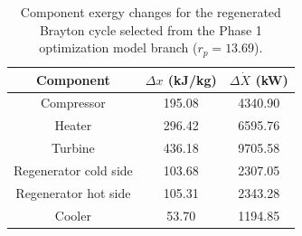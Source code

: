 \begin{table}[htbp]
    \centering
    \caption{Component exergy changes for the regenerated Brayton cycle selected from the Phase 1 optimization model branch ($r_p = 13.69$).}
    \label{tab:phase5_component_exergy_phase1_optimization}
    \begin{tabular}{c c c}
        \hline
        Component & $\Delta x$ (kJ/kg) & $\Delta \dot{X}$ (kW) \\
        \hline
        Compressor & 195.08 & 4340.90 \\
        Heater & 296.42 & 6595.76 \\
        Turbine & 436.18 & 9705.58 \\
        Regenerator cold side & 103.68 & 2307.05 \\
        Regenerator hot side & 105.31 & 2343.28 \\
        Cooler & 53.70 & 1194.85 \\
        \hline
    \end{tabular}
\end{table}